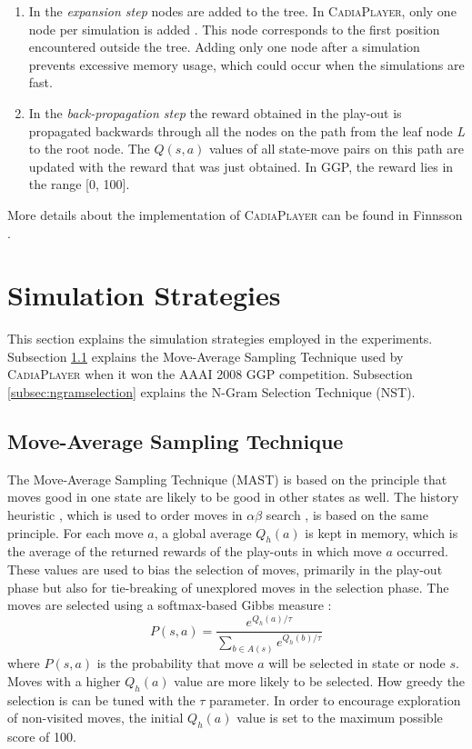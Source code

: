 \documentclass[journal]{IEEEtran}
\begin{document}
\begin{enumerate}
\item In the \textit{expansion step} nodes are added to the tree. In \textsc{CadiaPlayer}, only one node per simulation is added \cite{mctsSelectivity}. This node corresponds to the first position encountered outside the tree. Adding only one node after a simulation prevents excessive memory usage, which could occur when the simulations are fast.

\item In the \textit{back-propagation step} the reward obtained in the play-out is propagated backwards through all the nodes on the path from the leaf node \textit{L} to the root node. The $Q(s,a)$ values of all state-move pairs on this path are updated with the reward that was just obtained. In GGP, the reward lies in the range [0, 100].
\end{enumerate}

More details about the implementation of \textsc{CadiaPlayer} can be found in Finnsson \cite{finnsonphdthesis}.


\section{Simulation Strategies}
\label{sec:simstrat}
This section explains the simulation strategies employed in the experiments. Subsection \ref{subsec:mast} explains the Move-Average Sampling Technique used by \textsc{CadiaPlayer} when it won the AAAI 2008 GGP competition. Subsection \ref{subsec:ngramselection} explains the N-Gram Selection Technique (NST).

\subsection{Move-Average Sampling Technique}
\label{subsec:mast}
The Move-Average Sampling Technique (MAST) \cite{FinnssonB08a,finnsonphdthesis} is based on the principle that moves good in one state are likely to be good in other states as well. The history heuristic \cite{schaeffer83}, which is used to order moves in $\alpha\beta$ search \cite{alphabeta}, is based on the same principle. For each move $a$, a global average $Q_h(a)$ is kept in memory, which is the average of the returned rewards of the play-outs in which move $a$ occurred.
These values are used to bias the selection of moves, primarily in the play-out phase but also for tie-breaking of unexplored moves in the selection phase.  The moves are selected using a softmax-based Gibbs measure \cite{gibbs}: 
\begin{equation}
\label{eq:gibs}
P(s,a) = \frac{e^{Q_h(a)/ \tau}}{\sum_{b \in A(s)} e^{Q_h(b)/ \tau}}
\end{equation}
where $P(s,a)$ is the probability that move $a$ will be selected in state or node $s$. Moves with a higher $Q_h(a)$ value are more likely to be selected. How greedy the selection is can be tuned with the $\tau$ parameter. In order to encourage exploration of non-visited moves, the initial $Q_h(a)$ value is set to the maximum possible score of 100.
\end{document}

